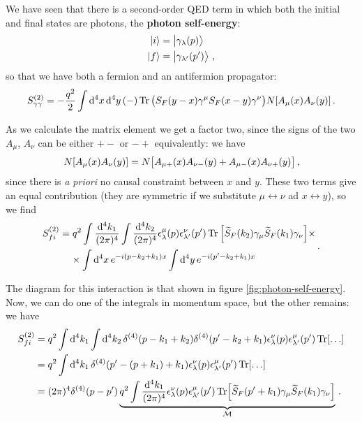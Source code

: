 \documentclass[main.tex]{subfiles}
\begin{document}
We have seen that there is a second-order QED term in which both the initial and final states are photons, the \textbf{photon self-energy}: 
%
\begin{align}
\ket{i} &= \ket{\gamma_{\lambda } (p)} \\
\ket{f} &= \ket{\gamma_{\lambda' } (p')}
\,,
\end{align}
%
so that we have both a fermion and an antifermion propagator: 
%
\begin{align}
S^{(2)}_{\gamma \gamma } = 
- \frac{q^2}{2} \int \dd[4]{x} \dd[4]{y}
(-) \Tr \qty(S_F(y-x) \gamma^{\mu } S_F(x-y) \gamma^{\nu })
N[A_{\mu } (x) A_{\nu } (y)]
\,.
\end{align}

As we calculate the matrix element we get a factor two, since the signs of the two \(A_{\mu }\), \(A_{\nu }\) can be either \(+ -\) or \(- +\) equivalently: we have 
%
\begin{align}
N[A_{\mu }(x) A_{\nu } (y)] = N \qty[
    A_{\mu +} (x) A_{\nu -} (y) +
    A_{\mu -} (x) A_{\nu +} (y) 
]
\,,
\end{align}
%
since there is \emph{a priori} no causal constraint between \(x\) and \(y\). These two terms give an equal contribution (they are symmetric if we substitute \(\mu \leftrightarrow \nu \) ad \(x \leftrightarrow y\)), so we find 
%
\begin{align}
\begin{split}
S^{(2)}_{fi} &=
q^2 \int \frac{ \dd[4]{k_1 }}{(2 \pi )^{4}}
\int \frac{ \dd[4]{k_2 }}{(2 \pi )^{4}}
\epsilon^{\mu}_{\lambda }(p) \epsilon^{\nu }_{\lambda '} (p') 
\Tr \qty[\widetilde{S}_{F}(k_2 ) \gamma_{\mu } \widetilde{S}_{F} (k_1 )\gamma_{\nu }] \times \\
&\phantom{=}\ \times 
\int \dd[4]{x} e^{-i(p - k_2 + k_1 )x}  
\int \dd[4]{y} e^{-i (p' - k_2 + k_1 ) x}
\end{split}
\,.
\end{align}

The diagram for this interaction is that shown in figure \ref{fig:photon-self-energy}. 
Now, we can do one of the integrals in momentum space, but the other remains: we have 
%
\begin{align}
S^{(2)}_{fi} &= q^2 \int \dd[4]{k_1 } \int \dd[4]{k_2 } \delta^{(4)}(p - k_1 + k_2 )
\delta^{(4)} (p' - k_2 + k_1 )
\epsilon^{\nu }_{\lambda }( p) \epsilon^{\mu }_{\lambda '} (p') \Tr[\dots]  \\
&= q^2 \int \dd[4]{k_1 } \delta^{(4)} (p' - (p + k_1 ) + k_1 ) \epsilon^{\nu }_{\lambda }( p) \epsilon^{\mu }_{\lambda '} (p') \Tr[\dots]  \\
&= ( 2 \pi )^{4} \delta^{(4)} (p - p') \underbrace{q^2\int \frac{ \dd[4]{k_1 }}{(2 \pi )^{4}}
\epsilon^{\nu }_{\lambda }( p) \epsilon^{\mu }_{\lambda '} (p') \Tr[\widetilde{S}_{F}(p' + k_1  ) \gamma_{\mu } \widetilde{S}_{F} (k_1 )\gamma_{\nu }]}_{\mathcal{M}}
\,.
\end{align}
\end{document}
